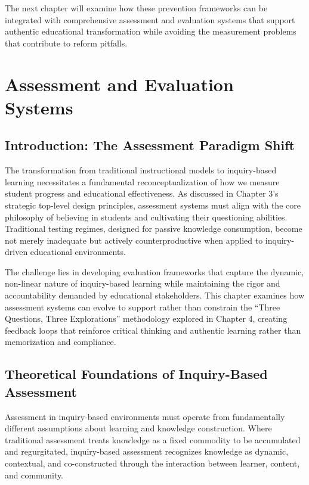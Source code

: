 \documentclass[
  Letterpaper,
]{scrbook}
\begin{document}
The next chapter will examine how these prevention frameworks can be
integrated with comprehensive assessment and evaluation systems that
support authentic educational transformation while avoiding the
measurement problems that contribute to reform pitfalls.


\chapter{Assessment and Evaluation
Systems}\label{assessment-and-evaluation-systems}

\section{Introduction: The Assessment Paradigm
Shift}\label{introduction-the-assessment-paradigm-shift}

The transformation from traditional instructional models to
inquiry-based learning necessitates a fundamental reconceptualization of
how we measure student progress and educational effectiveness. As
discussed in Chapter 3's strategic top-level design principles,
assessment systems must align with the core philosophy of believing in
students and cultivating their questioning abilities. Traditional
testing regimes, designed for passive knowledge consumption, become not
merely inadequate but actively counterproductive when applied to
inquiry-driven educational environments.

The challenge lies in developing evaluation frameworks that capture the
dynamic, non-linear nature of inquiry-based learning while maintaining
the rigor and accountability demanded by educational stakeholders. This
chapter examines how assessment systems can evolve to support rather
than constrain the ``Three Questions, Three Explorations'' methodology
explored in Chapter 4, creating feedback loops that reinforce critical
thinking and authentic learning rather than memorization and compliance.

\section{Theoretical Foundations of Inquiry-Based
Assessment}\label{theoretical-foundations-of-inquiry-based-assessment}

Assessment in inquiry-based environments must operate from fundamentally
different assumptions about learning and knowledge construction. Where
traditional assessment treats knowledge as a fixed commodity to be
accumulated and regurgitated, inquiry-based assessment recognizes
knowledge as dynamic, contextual, and co-constructed through the
interaction between learner, content, and community.
\end{document}
